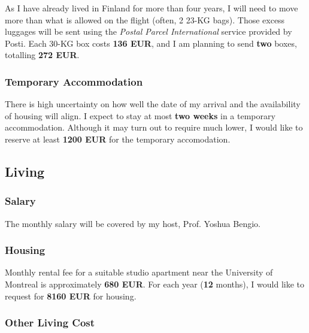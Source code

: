 \documentclass[11pt, oneside]{essay}
\begin{document}
As I have already lived in Finland for more than four years,
I will need to move more than what is allowed on the flight
(often, 2 23-KG bags). Those excess luggages will be sent using
the \textit{Postal Parcel International} service provided by
Posti. Each 30-KG box costs \textbf{136 EUR}, and I am planning
to send \textbf{two} boxes, totalling \textbf{272 EUR}.

\subsubsection{Temporary Accommodation}

There is high uncertainty on how well the date of my arrival and
the availability of housing will align. I expect to stay at most
\textbf{two weeks} in a temporary accommodation. Although it may
turn out to require much lower, I would like to reserve at least
\textbf{1200 EUR} for the temporary accomodation.



\subsection{Living}

\subsubsection{Salary}

The monthly salary will be covered by my host, Prof. Yoshua Bengio.

\subsubsection{Housing}

Monthly rental fee for a suitable studio apartment near the
University of Montreal is approximately \textbf{680 EUR}. For
each year (\textbf{12} months), I would like to request for
\textbf{8160 EUR} for housing.

\subsubsection{Other Living Cost}








%
%
\end{document}

